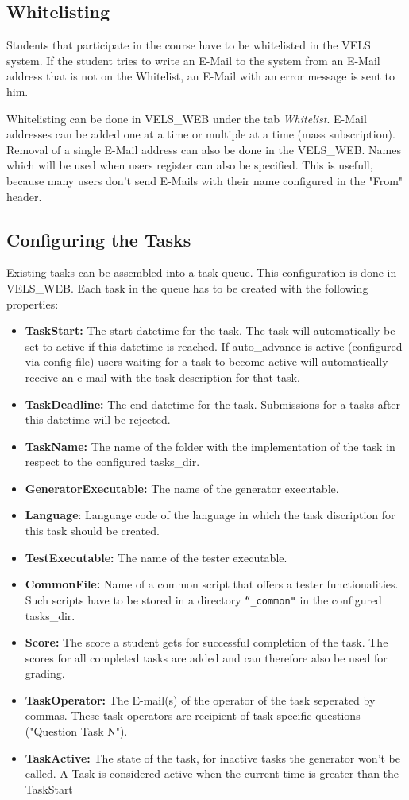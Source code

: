 \subsection{Whitelisting} \label{sub:whitelisting}
Students that participate in the course have to be whitelisted in the VELS system. If the student
tries to write an E-Mail to the system from an E-Mail address that is not on the Whitelist, an E-Mail
with an error message is sent to him.

Whitelisting can be done in VELS\_WEB under the tab {\it Whitelist}. E-Mail addresses can be added
one at a time or multiple at a time (mass subscription). Removal of a single E-Mail address
can also be done in the VELS\_WEB. Names which will be used when users register can also be 
specified. This is usefull, because many users don't send E-Mails with their name configured
in the "From" header.

\subsection{Configuring the Tasks} \label{sub:configTasks}
Existing tasks can be assembled into a task queue. This configuration is done in VELS\_WEB.
Each task in the queue has to be created with the following properties:
\begin{itemize}
\item {\bf TaskStart:} The start datetime for the task. The task will automatically
    be set to active if this datetime is reached. If auto\_advance is active (configured 
    via config file) users waiting for a task to become active will automatically 
    receive an e-mail with the task description for that task.
\item {\bf TaskDeadline:} The end datetime for the task. Submissions for a tasks after
    this datetime will be rejected.
\item {\bf TaskName:} The name of the folder with the implementation of the task in respect
	to the configured tasks\_dir.
\item {\bf GeneratorExecutable:} The name of the generator executable.
\item {\bf Language}: Language code of the language in which the task discription for
	this task should be created.
\item {\bf TestExecutable:} The name of the tester executable.
\item {\bf CommonFile:} Name of a common script that offers a tester functionalities.
	Such scripts have to be stored in a directory {\tt ``\_common"} in the configured
	tasks\_dir.
\item {\bf Score:} The score a student gets for successful completion of the task. The
    scores for all completed tasks are added and can therefore also be used for grading.
\item {\bf TaskOperator:} The E-mail(s) of the operator of the task seperated by commas. 
	These task operators are recipient of task specific questions ("Question Task N").
\item {\bf TaskActive:} The state of the task, for inactive tasks the generator won't
    be called. A Task is considered active when the current time is greater than the 
    TaskStart
\end{itemize}


